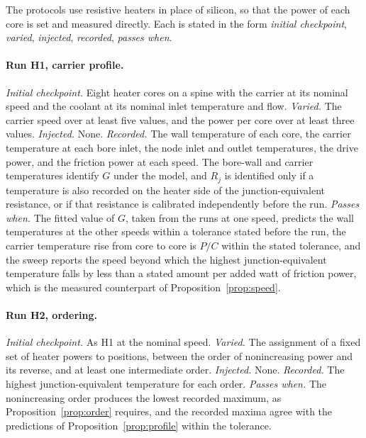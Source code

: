 \documentclass[11pt]{article}
\theoremstyle{definition}
\theoremstyle{plain}
\theoremstyle{remark}
\begin{document}
The protocols use resistive heaters in place of silicon, so that the power of each core is set and measured directly. Each is stated in the form \emph{initial checkpoint}, \emph{varied}, \emph{injected}, \emph{recorded}, \emph{passes when}.

\paragraph{Run H1, carrier profile.} \emph{Initial checkpoint.} Eight heater cores on a spine with the carrier at its nominal speed and the coolant at its nominal inlet temperature and flow. \emph{Varied.} The carrier speed over at least five values, and the power per core over at least three values. \emph{Injected.} None. \emph{Recorded.} The wall temperature of each core, the carrier temperature at each bore inlet, the node inlet and outlet temperatures, the drive power, and the friction power at each speed. The bore-wall and carrier temperatures identify $G$ under the model, and $R_j$ is identified only if a temperature is also recorded on the heater side of the junction-equivalent resistance, or if that resistance is calibrated independently before the run. \emph{Passes when.} The fitted value of $G$, taken from the runs at one speed, predicts the wall temperatures at the other speeds within a tolerance stated before the run, the carrier temperature rise from core to core is $P/C$ within the stated tolerance, and the sweep reports the speed beyond which the highest junction-equivalent temperature falls by less than a stated amount per added watt of friction power, which is the measured counterpart of Proposition~\ref{prop:speed}.

\paragraph{Run H2, ordering.} \emph{Initial checkpoint.} As H1 at the nominal speed. \emph{Varied.} The assignment of a fixed set of heater powers to positions, between the order of nonincreasing power and its reverse, and at least one intermediate order. \emph{Injected.} None. \emph{Recorded.} The highest junction-equivalent temperature for each order. \emph{Passes when.} The nonincreasing order produces the lowest recorded maximum, as Proposition~\ref{prop:order} requires, and the recorded maxima agree with the predictions of Proposition~\ref{prop:profile} within the tolerance.
\end{document}
